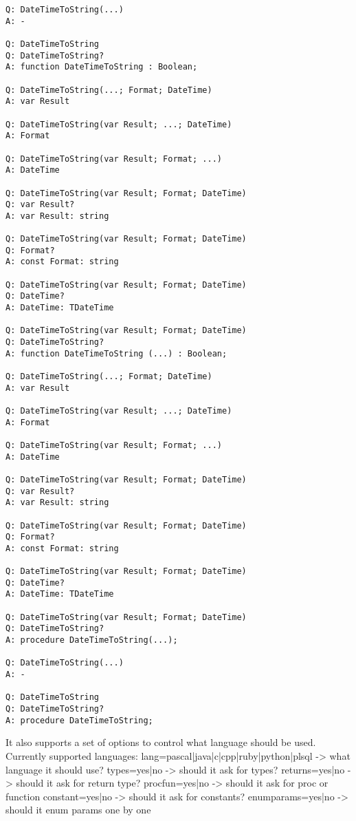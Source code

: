 \documentclass[a4paper,11pt]{article}
\begin{document}
\begin{verbatim}
Q: DateTimeToString(...)
A: -

Q: DateTimeToString
Q: DateTimeToString?
A: function DateTimeToString : Boolean;

Q: DateTimeToString(...; Format; DateTime)
A: var Result

Q: DateTimeToString(var Result; ...; DateTime)
A: Format

Q: DateTimeToString(var Result; Format; ...)
A: DateTime

Q: DateTimeToString(var Result; Format; DateTime)
Q: var Result?
A: var Result: string

Q: DateTimeToString(var Result; Format; DateTime)
Q: Format?
A: const Format: string

Q: DateTimeToString(var Result; Format; DateTime)
Q: DateTime?
A: DateTime: TDateTime

Q: DateTimeToString(var Result; Format; DateTime)
Q: DateTimeToString?
A: function DateTimeToString (...) : Boolean;

Q: DateTimeToString(...; Format; DateTime)
A: var Result

Q: DateTimeToString(var Result; ...; DateTime)
A: Format

Q: DateTimeToString(var Result; Format; ...)
A: DateTime

Q: DateTimeToString(var Result; Format; DateTime)
Q: var Result?
A: var Result: string

Q: DateTimeToString(var Result; Format; DateTime)
Q: Format?
A: const Format: string

Q: DateTimeToString(var Result; Format; DateTime)
Q: DateTime?
A: DateTime: TDateTime

Q: DateTimeToString(var Result; Format; DateTime)
Q: DateTimeToString?
A: procedure DateTimeToString(...);

Q: DateTimeToString(...)
A: -

Q: DateTimeToString
Q: DateTimeToString?
A: procedure DateTimeToString;
\end{verbatim}


It also supports a set of options to control what language should be used.
Currently supported languages:
lang=pascal|java|c|cpp|ruby|python|plsql -> what language it should use?
types=yes|no -> should it ask for types?
returns=yes|no -> should it ask for return type?
procfun=yes|no -> should it ask for proc or function
constant=yes|no -> should it ask for constants?
enumparams=yes|no -> should it enum params one by one
\end{document}
